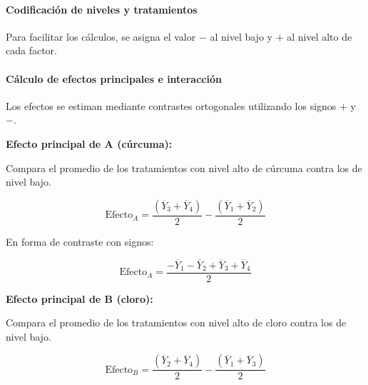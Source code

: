 \paragraph{Codificación de niveles y tratamientos}

Para facilitar los cálculos, se asigna el valor $-$ al nivel bajo y $+$ al nivel alto de cada factor.

\begin{table}[H]
\centering
{}
\caption{Codificación de niveles y promedios por tratamiento.}
\end{table}

\paragraph{Cálculo de efectos principales e interacción}

Los efectos se estiman mediante contrastes ortogonales utilizando los signos $+$ y $-$.

\textbf{Efecto principal de A (cúrcuma):}

Compara el promedio de los tratamientos con nivel alto de cúrcuma contra los de nivel bajo.

\[
\text{Efecto}_A = \frac{(\overline{Y}_3 + \overline{Y}_4)}{2} - \frac{(\overline{Y}_1 + \overline{Y}_2)}{2}
\]

En forma de contraste con signos:

\[
\text{Efecto}_A = \frac{-\overline{Y}_1 - \overline{Y}_2 + \overline{Y}_3 + \overline{Y}_4}{2}
\]

\textbf{Efecto principal de B (cloro):}

Compara el promedio de los tratamientos con nivel alto de cloro contra los de nivel bajo.

\[
\text{Efecto}_B = \frac{(\overline{Y}_2 + \overline{Y}_4)}{2} - \frac{(\overline{Y}_1 + \overline{Y}_3)}{2}
\]

